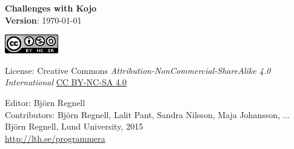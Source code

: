 { \vspace{250mm}\fontsize{11}{11}\flushleft\selectfont 
\vspace*{\fill}

\begin{center}
\Huge {\bf Challenges with Kojo}\\
\Large {\bf Version}: \today{ }
\end{center}
\vskip7cm

\large
\includegraphics{../img/cc.png}

License: Creative Commons {\it Attribution-NonCommercial-ShareAlike 4.0 International} 
\href{http://creativecommons.org/licenses/by-nc-sa/4.0/}{CC BY-NC-SA 4.0}

Editor: Björn Regnell\\
Contributors: Björn Regnell, Lalit Pant, Sandra Nilsson, Maja Johansson, ... \\
\textcopyright{ }Björn Regnell, Lund University, 2015 \\
\url{http://lth.se/programmera}
}
